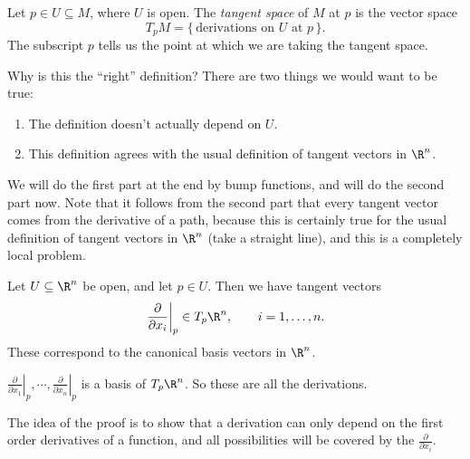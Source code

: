 \documentclass[a4paper]{article}
\begin{document}
\begin{defi}
  Let $p \in U \subseteq M$, where $U$ is open. The \emph{tangent space} of $M$ at $p$ is the vector space
  \[
    T_p M = \{ \, \text{derivations on $U$ at $p$} \, \}.
  \]
  The subscript $p$ tells us the point at which we are taking the tangent space.
\end{defi}
Why is this the ``right'' definition? There are two things we would want to be true:
\begin{enumerate}
  \item The definition doesn't actually depend on $U$.
  \item This definition agrees with the usual definition of tangent vectors in $\R^n$.
\end{enumerate}
We will do the first part at the end by bump functions, and will do the second part now. Note that it follows from the second part that every tangent vector comes from the derivative of a path, because this is certainly true for the usual definition of tangent vectors in $\R^n$ (take a straight line), and this is a completely local problem.

\begin{eg}
  Let $U \subseteq \R^n$ be open, and let $p \in U$. Then we have tangent vectors
  \[
    \left.\frac{\partial}{\partial x_i}\right|_p \in T_p \R^n, \qquad i = 1, \ldots, n.
  \]
  These correspond to the canonical basis vectors in $\R^n$.
\end{eg}

\begin{lemma}
  $\left.\frac{\partial}{\partial x_1}\right|_p, \cdots, \left.\frac{\partial}{\partial x_n}\right|_p$ is a basis of $T_p \R^n$. So these are all the derivations.
\end{lemma}

The idea of the proof is to show that a derivation can only depend on the first order derivatives of a function, and all possibilities will be covered by the $\frac{\partial}{\partial x_i}$.
\end{document}
